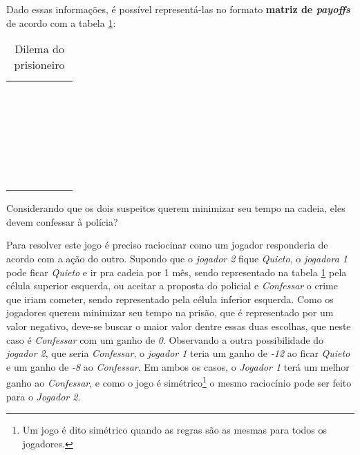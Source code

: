 Dado essas informações, é possível representá-las no formato {\bfseries matriz de \emph{payoffs}} de acordo com a tabela \ref{tab:dilema-prisioneiro}:

\begin{table}[ht]
\centering
\begin{tabular}{|c|c|c|c|}
	\cline{3-4}
	\multicolumn{1}{c}{} &  & \multicolumn{2}{c|}{\color{red}{\bfseries Jogador 2}}\tabularnewline
	\cline{3-4}
	\multicolumn{1}{c}{} &  & \color{red}{\scshape Quieto}\  & \color{red}{\scshape Confessa}\ \tabularnewline
	\hline
	\multirow{2}{*}{\begin{turn}{90}
	\color{blue}{\bfseries Jogador 1}\
	\end{turn}} & \begin{turn}{90}
	\color{blue}{\scshape Quieto}\
	\end{turn} & \color{black}{\Large(}\color{blue}{\Large -1}\color{black}{\Large,}\color{red}{\Large -1}\color{black}{\Large)} & \color{black}{\Large(}\color{blue}{\Large -12}\color{black}{\Large,}\color{red}{\Large 0}\color{black}{\Large)}\tabularnewline
	\cline{2-4}
	 & \begin{turn}{90}
	\color{blue}{\scshape Confessa}\
	\end{turn} & \color{black}{\Large(}\color{blue}{\Large 0}\color{black}{\Large,}\color{red}{\Large -12}\color{black}{\Large)} & \color{black}{\Large(}\color{blue}{\Large -8}\color{black}{\Large,}\color{red}{\Large -8}\color{black}{\Large)}\tabularnewline
	\hline
\end{tabular}
\caption{Dilema do prisioneiro}
\label{tab:dilema-prisioneiro}
\end{table}

Considerando que os dois suspeitos querem minimizar seu tempo na cadeia, eles devem confessar à polícia?

Para resolver este jogo é preciso raciocinar como um jogador responderia de acordo com a ação do outro. Supondo que o \emph{\color{red}jogador 2} fique \emph{\color{red}Quieto}, o \emph{\color{blue}jogadora 1} pode ficar \emph{\color{blue}Quieto} e ir pra cadeia por 1 mês, sendo representado na tabela \ref{tab:dilema-prisioneiro} pela célula superior esquerda, ou aceitar a proposta do policial e \emph{\color{blue}Confessar} o crime que iriam cometer, sendo representado pela célula inferior esquerda. Como os jogadores querem minimizar seu tempo na prisão, que é representado por um valor negativo, deve-se buscar o maior valor dentre essas duas escolhas, que neste caso é \emph{\color{blue}Confessar} com um ganho de \emph{\color{blue}0}. Observando a outra possibilidade do \emph{\color{red}jogador 2}, que seria \emph{\color{red}Confessar}, o \emph{\color{blue}jogador 1} teria um ganho de \emph{\color{blue}-12} ao ficar \emph{\color{blue}Quieto} e um ganho de \emph{\color{blue}-8} ao \emph{\color{blue}Confessar}. Em ambos os casos, o \emph{\color{blue}Jogador 1} terá um melhor ganho ao \emph{\color{blue}Confessar}, e como o jogo é simétrico\footnote{Um jogo é dito simétrico quando as regras são as mesmas para todos os jogadores.} o mesmo raciocínio pode ser feito para o \emph{\color{red}Jogador 2}.

